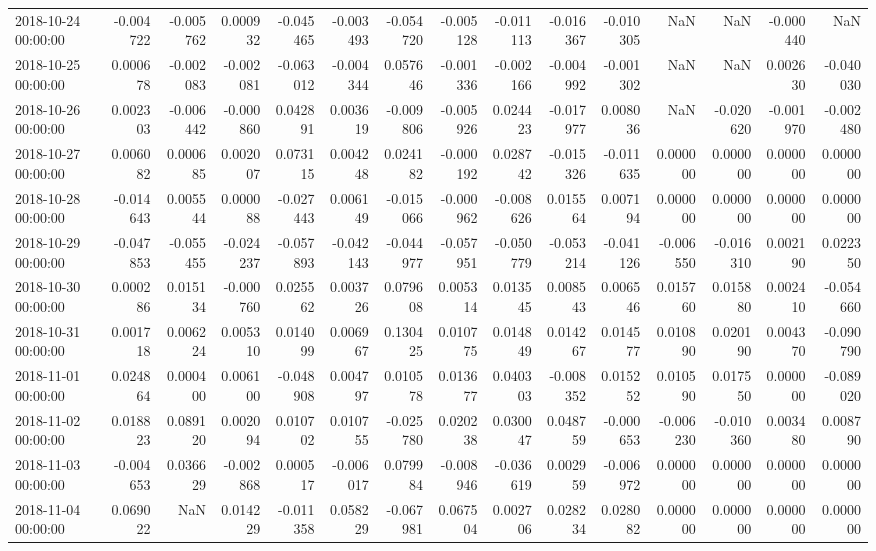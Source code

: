 \begin{tabular}{lrrrrrrrrrrrrrr}
2018-10-24 00:00:00 & -0.004722 & -0.005762 & 0.000932 & -0.045465 & -0.003493 & -0.054720 & -0.005128 & -0.011113 & -0.016367 & -0.010305 & NaN & NaN & -0.000440 & NaN \\
2018-10-25 00:00:00 & 0.000678 & -0.002083 & -0.002081 & -0.063012 & -0.004344 & 0.057646 & -0.001336 & -0.002166 & -0.004992 & -0.001302 & NaN & NaN & 0.002630 & -0.040030 \\
2018-10-26 00:00:00 & 0.002303 & -0.006442 & -0.000860 & 0.042891 & 0.003619 & -0.009806 & -0.005926 & 0.024423 & -0.017977 & 0.008036 & NaN & -0.020620 & -0.001970 & -0.002480 \\
2018-10-27 00:00:00 & 0.006082 & 0.000685 & 0.002007 & 0.073115 & 0.004248 & 0.024182 & -0.000192 & 0.028742 & -0.015326 & -0.011635 & 0.000000 & 0.000000 & 0.000000 & 0.000000 \\
2018-10-28 00:00:00 & -0.014643 & 0.005544 & 0.000088 & -0.027443 & 0.006149 & -0.015066 & -0.000962 & -0.008626 & 0.015564 & 0.007194 & 0.000000 & 0.000000 & 0.000000 & 0.000000 \\
2018-10-29 00:00:00 & -0.047853 & -0.055455 & -0.024237 & -0.057893 & -0.042143 & -0.044977 & -0.057951 & -0.050779 & -0.053214 & -0.041126 & -0.006550 & -0.016310 & 0.002190 & 0.022350 \\
2018-10-30 00:00:00 & 0.000286 & 0.015134 & -0.000760 & 0.025562 & 0.003726 & 0.079608 & 0.005314 & 0.013545 & 0.008543 & 0.006546 & 0.015760 & 0.015880 & 0.002410 & -0.054660 \\
2018-10-31 00:00:00 & 0.001718 & 0.006224 & 0.005310 & 0.014099 & 0.006967 & 0.130425 & 0.010775 & 0.014849 & 0.014267 & 0.014577 & 0.010890 & 0.020190 & 0.004370 & -0.090790 \\
2018-11-01 00:00:00 & 0.024864 & 0.000400 & 0.006100 & -0.048908 & 0.004797 & 0.010578 & 0.013677 & 0.040303 & -0.008352 & 0.015252 & 0.010590 & 0.017550 & 0.000000 & -0.089020 \\
2018-11-02 00:00:00 & 0.018823 & 0.089120 & 0.002094 & 0.010702 & 0.010755 & -0.025780 & 0.020238 & 0.030047 & 0.048759 & -0.000653 & -0.006230 & -0.010360 & 0.003480 & 0.008790 \\
2018-11-03 00:00:00 & -0.004653 & 0.036629 & -0.002868 & 0.000517 & -0.006017 & 0.079984 & -0.008946 & -0.036619 & 0.002959 & -0.006972 & 0.000000 & 0.000000 & 0.000000 & 0.000000 \\
2018-11-04 00:00:00 & 0.069022 & NaN & 0.014229 & -0.011358 & 0.058229 & -0.067981 & 0.067504 & 0.002706 & 0.028234 & 0.028082 & 0.000000 & 0.000000 & 0.000000 & 0.000000 \\

\end{tabular}
